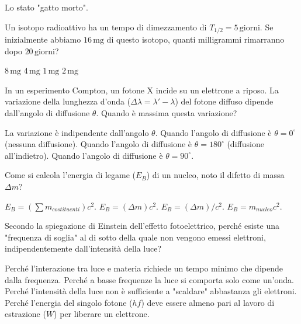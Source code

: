 \documentclass{exam}%
\begin{document}
\begin{questions}
\begin{choices}
\choice Lo stato "gatto morto".%
\end{choices}%
\question Un isotopo radioattivo ha un tempo di dimezzamento di $T_{1/2} = 5 \, \text{giorni}$. Se inizialmente abbiamo $16 \, \text{mg}$ di questo isotopo, quanti milligrammi rimarranno dopo $20 \, \text{giorni}$?%
\vspace{0.2em}%
\begin{multicols}{4}%
\begin{choices}%
\choice $8 \, \text{mg}$%
\choice $4 \, \text{mg}$%
\choice $1 \, \text{mg}$%
\choice $2 \, \text{mg}$%
\end{choices}%
\end{multicols}%
\question In un esperimento Compton, un fotone X incide su un elettrone a riposo. La variazione della lunghezza d'onda ($\Delta \lambda = \lambda' - \lambda$) del fotone diffuso dipende dall'angolo di diffusione $\theta$. Quando è massima questa variazione?%
\vspace{0.2em}%
\begin{choices}%
\choice La variazione è indipendente dall'angolo $\theta$.%
\choice Quando l'angolo di diffusione è $\theta = 0^\circ$ (nessuna diffusione).%
\choice Quando l'angolo di diffusione è $\theta = 180^\circ$ (diffusione all'indietro).%
\choice Quando l'angolo di diffusione è $\theta = 90^\circ$.%
\end{choices}%
\question Come si calcola l'energia di legame ($E_B$) di un nucleo, noto il difetto di massa $\Delta m$?%
\vspace{0.2em}%
\begin{multicols}{4}%
\begin{choices}%
\choice $E_B = (\sum m_{costituenti}) c^2$.%
\choice $E_B = (\Delta m) c^2$.%
\choice $E_B = (\Delta m) / c^2$.%
\choice $E_B = m_{nucleo} c^2$.%
\end{choices}%
\end{multicols}%
\question Secondo la spiegazione di Einstein dell'effetto fotoelettrico, perché esiste una "frequenza di soglia" al di sotto della quale non vengono emessi elettroni, indipendentemente dall'intensità della luce?%
\vspace{0.2em}%
\begin{choices}%
\choice Perché l'interazione tra luce e materia richiede un tempo minimo che dipende dalla frequenza.%
\choice Perché a basse frequenze la luce si comporta solo come un'onda.%
\choice Perché l'intensità della luce non è sufficiente a "scaldare" abbastanza gli elettroni.%
\choice Perché l'energia del singolo fotone ($hf$) deve essere almeno pari al lavoro di estrazione ($W$) per liberare un elettrone.%

\end{choices}
\end{questions}
\end{document}

